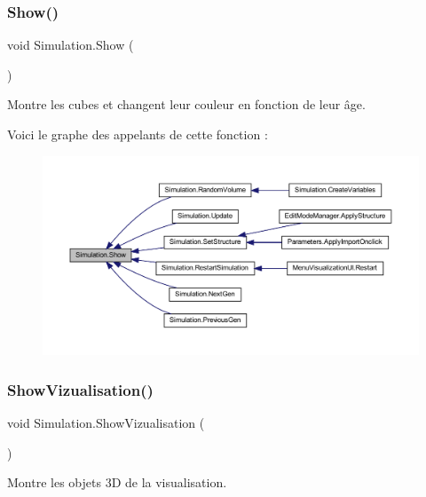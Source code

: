 \subsubsection{\texorpdfstring{Show()}{Show()}}
{\footnotesize\ttfamily void Simulation.\+Show (\begin{DoxyParamCaption}{ }\end{DoxyParamCaption})\hspace{0.3cm}{\ttfamily [inline]}}



Montre les cubes et changent leur couleur en fonction de leur âge. 

Voici le graphe des appelants de cette fonction \+:
\nopagebreak
\begin{figure}[H]
\begin{center}
\leavevmode
\includegraphics[width=350pt]{class_simulation_af5fd57d6f657f07bc0fac7085832dc82_icgraph}
\end{center}
\end{figure}
\mbox{\label{class_simulation_acc3c641f3874f1805c3a13d2153b6023}} 
\subsubsection{\texorpdfstring{Show\+Vizualisation()}{ShowVizualisation()}}
{\footnotesize\ttfamily void Simulation.\+Show\+Vizualisation (\begin{DoxyParamCaption}{ }\end{DoxyParamCaption})\hspace{0.3cm}{\ttfamily [inline]}}



Montre les objets 3D de la visualisation. 

